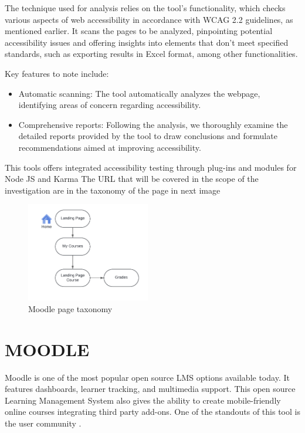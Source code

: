 \documentclass{IEEEtran}
\begin{document}
The technique used for analysis relies on the tool's functionality, which checks various aspects of web accessibility in accordance with WCAG 2.2 guidelines, as mentioned earlier. It scans the pages to be analyzed, pinpointing potential accessibility issues and offering insights into elements that don't meet specified standards, such as exporting results in Excel format, among other functionalities.

Key features to note include:

\begin{itemize}
    \item Automatic scanning: The tool automatically analyzes the webpage, identifying areas of concern regarding accessibility.
    \item Comprehensive reports: Following the analysis, we thoroughly examine the detailed reports provided by the tool to draw conclusions and formulate recommendations aimed at improving accessibility.
\end{itemize}

This tools offers integrated accessibility testing through plug-ins and modules for Node JS and Karma \cite{Karma}
The URL that will be covered in the scope of the investigation are in the taxonomy of the page in next image

\begin{figure}[H]
    \includegraphics[width=0.48\textwidth]{images/figure1.png}
    \caption{Moodle page taxonomy}
    \label{fig:figure1}
\end{figure}

\section{MOODLE}
Moodle is one of the most popular open source LMS options available today. It features dashboards, learner tracking, and multimedia support. This open source Learning Management System also gives the ability to create mobile-friendly online courses integrating third party add-ons. One of the standouts of this tool is the user community \cite{Moodle2024}.
\end{document}
